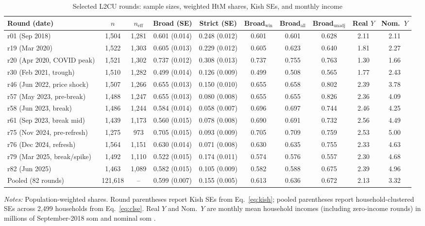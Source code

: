 \documentclass[11pt]{article}
\begin{document}
\begin{table}[tbp]
\centering
\caption{Selected L2CU rounds: sample sizes, weighted HtM shares, Kish SEs, and monthly income}
\label{tab:rounds}
\scriptsize
\setlength{\tabcolsep}{2.2pt}
\begin{tabular}{lccccccccc}
\toprule
Round (date) & $n$ & $n_{\text{eff}}$ & Broad (SE) & Strict (SE) & Broad$_{\text{win}}$ & Broad$_{\text{all}}$ & Broad$_{\text{unadj}}$ & Real $Y$ & Nom.\ $Y$ \\
\midrule
r01 (Sep 2018) & 1,504 & 1,281 & 0.601 (0.014) & 0.248 (0.012) & 0.601 & 0.601 & 0.628 & 2.11 & 2.11 \\
r19 (Mar 2020) & 1,522 & 1,303 & 0.605 (0.013) & 0.229 (0.012) & 0.605 & 0.623 & 0.640 & 1.81 & 2.27 \\
r20 (Apr 2020, COVID peak) & 1,521 & 1,302 & 0.737 (0.012) & 0.308 (0.013) & 0.737 & 0.755 & 0.763 & 1.30 & 1.66 \\
r30 (Feb 2021, trough) & 1,510 & 1,282 & 0.499 (0.014) & 0.126 (0.009) & 0.499 & 0.508 & 0.565 & 1.77 & 2.43 \\
r46 (Jun 2022, price shock) & 1,507 & 1,266 & 0.655 (0.013) & 0.150 (0.010) & 0.655 & 0.658 & 0.802 & 2.39 & 3.78 \\
r57 (May 2023, pre-break) & 1,488 & 1,247 & 0.655 (0.013) & 0.080 (0.008) & 0.655 & 0.655 & 0.826 & 2.36 & 4.09 \\
r58 (Jun 2023, break) & 1,486 & 1,244 & 0.584 (0.014) & 0.058 (0.007) & 0.696 & 0.697 & 0.744 & 2.46 & 4.25 \\
r61 (Sep 2023, break mid) & 1,439 & 1,173 & 0.560 (0.015) & 0.078 (0.008) & 0.690 & 0.691 & 0.732 & 2.56 & 4.49 \\
r75 (Nov 2024, pre-refresh) & 1,275 & 973 & 0.705 (0.015) & 0.093 (0.009) & 0.705 & 0.709 & 0.759 & 2.53 & 5.00 \\
r76 (Dec 2024, refresh) & 1,564 & 1,151 & 0.630 (0.014) & 0.071 (0.008) & 0.630 & 0.635 & 0.755 & 2.33 & 4.63 \\
r79 (Mar 2025, break/spike) & 1,492 & 1,110 & 0.522 (0.015) & 0.174 (0.011) & 0.574 & 0.576 & 0.557 & 2.30 & 4.68 \\
r82 (Jun 2025) & 1,463 & 1,089 & 0.582 (0.015) & 0.105 (0.009) & 0.582 & 0.588 & 0.675 & 2.39 & 4.96 \\
\midrule
Pooled (82 rounds) & 121,618 & -- & 0.599 (0.007) & 0.155 (0.005) & 0.613 & 0.636 & 0.672 & 2.13 & 3.32 \\
\bottomrule
\end{tabular}
\begin{flushleft}
\footnotesize\textit{Notes:} Population-weighted shares. Round parentheses report Kish SEs from Eq.~\eqref{eq:kish}; pooled parentheses report household-clustered SEs across 2,499 households from Eq.~\eqref{eq:clse}. Real $Y$ and Nom.\ $Y$ are monthly mean household incomes (including zero-income rounds) in millions of September-2018 som and nominal som \citep{StatUz2026CPI}.
\end{flushleft}
\end{table}
\end{document}
